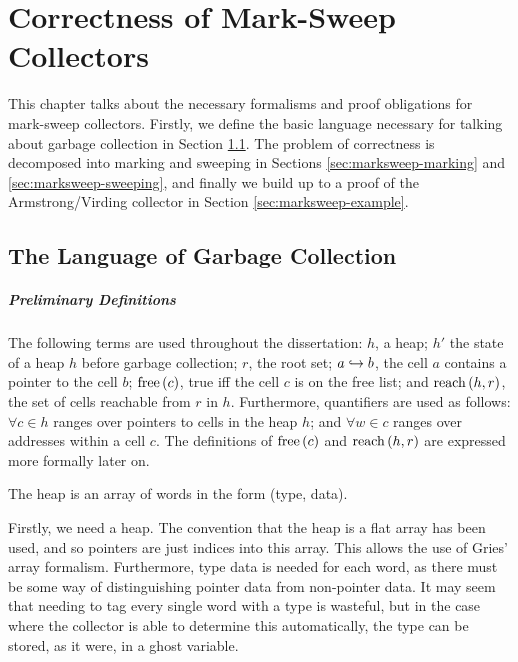 \chapter{Correctness of Mark-Sweep Collectors}
\label{sec:marksweep}

This chapter talks about the necessary formalisms and proof
obligations for mark-sweep collectors. Firstly, we define the basic
language necessary for talking about garbage collection in Section
\ref{sec:marksweep-defns}. The problem of correctness is decomposed
into marking and sweeping in Sections \ref{sec:marksweep-marking} and
\ref{sec:marksweep-sweeping}, and finally we build up to a proof of
the Armstrong/Virding\cite{Armstrong95} collector in Section
\ref{sec:marksweep-example}.

\section{The Language of Garbage Collection}
\label{sec:marksweep-defns}

\paragraph{Preliminary Definitions}
The following terms are used throughout the dissertation: $h$, a heap;
$h'$ the state of a heap $h$ before garbage collection; $r$, the root
set; $a \hookrightarrow b$, the cell $a$ contains a pointer to the cell $b$;
$\mathrm{free}\left(c\right)$, true iff the cell $c$ is on the free list; and
$\mathrm{reach}\left(h, r\right)$, the set of cells reachable from $r$ in
$h$. Furthermore, quantifiers are used as follows: $\forall c \in h$
ranges over pointers to cells in the heap $h$; and $\forall w \in c$
ranges over addresses within a cell $c$. The definitions of $\mathrm{free}\left(c\right)$
and $\mathrm{reach}\left(h, r\right)$ are expressed more formally later on.

\begin{definition}[Heap]
  \label{def:ms-heap}
  The heap is an array of words in the form (type, data).
\end{definition}

Firstly, we need a heap. The convention that the heap is a flat array
has been used, and so pointers are just indices into this array. This
allows the use of Gries' array formalism\cite{Gries87}. Furthermore,
type data is needed for each word, as there must be some way of
distinguishing pointer data from non-pointer data. It may seem that
needing to tag every single word with a type is wasteful, but in the
case where the collector is able to determine this automatically, the
type can be stored, as it were, in a ghost variable.

